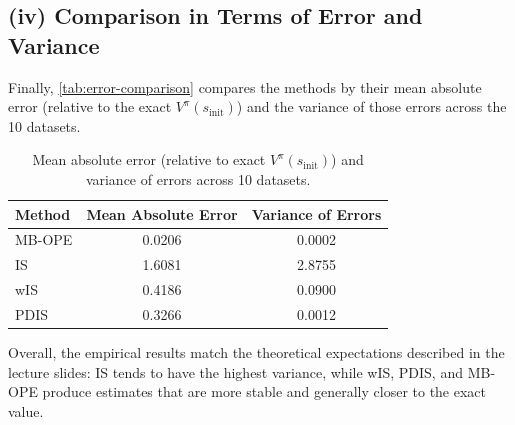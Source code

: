 \subsection*{(iv) Comparison in Terms of Error and Variance}
Finally, \autoref{tab:error-comparison} compares the methods by their mean absolute error (relative to the exact $V^\pi(s_{\text{init}})$) and the variance of those errors across the 10 datasets.
\begin{table}[h!]
\centering
\begin{tabular}{l|cc}
\hline
\textbf{Method} & \textbf{Mean Absolute Error} & \textbf{Variance of Errors} \\
\hline
MB-OPE & 0.0206 & 0.0002 \\
IS     & 1.6081 & 2.8755 \\
wIS    & 0.4186 & 0.0900 \\
PDIS   & 0.3266 & 0.0012 \\
\hline
\end{tabular}
\caption{Mean absolute error (relative to exact $V^\pi(s_{\text{init}})$) and variance of errors across 10 datasets.}
\label{tab:error-comparison}
\end{table}

Overall, the empirical results match the theoretical expectations described in the lecture slides: IS tends to have the highest variance, while wIS, PDIS, and MB-OPE produce estimates that are more stable and generally closer to the exact value.
